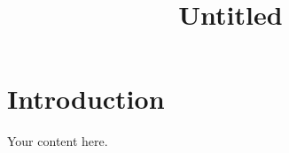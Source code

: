 \documentclass{article}
\title{Untitled}
\author{}
\date{}
\begin{document}
\maketitle

\section{Introduction}

Your content here.
\end{document}
